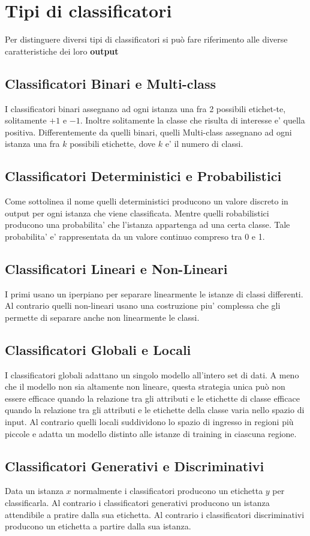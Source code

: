 \section{Tipi di classificatori}

  Per distinguere diversi tipi di classificatori si può fare riferimento alle diverse caratteristiche dei loro \textbf{output}

  \subsection*{Classificatori Binari e Multi-class}
    I classificatori binari assegnano ad ogni istanza una fra 2 possibili etichet-te, solitamente $+1$ e $-1$. Inoltre solitamente la classe che risulta di interesse e' quella positiva. Differentemente da quelli binari, quelli Multi-class assegnano ad ogni istanza una fra $k$ possibili etichette, dove $k$ e' il numero di classi.

  \subsection*{Classificatori Deterministici e Probabilistici}
    Come sottolinea il nome quelli deterministici producono un valore discreto in output per ogni istanza che viene classificata. Mentre quelli robabilistici producono una probabilita' che l'istanza appartenga ad una certa classe. Tale probabilita' e' rappresentata da un valore continuo compreso tra 0 e 1.

  \subsection*{Classificatori Lineari e Non-Lineari}
    I primi usano un iperpiano per separare linearmente le istanze di classi differenti. Al contrario quelli non-lineari usano una costruzione piu' complessa che gli permette di separare anche non linearmente le classi.

  \subsection*{Classificatori Globali e Locali}
    I classificatori globali adattano un singolo modello all'intero set di dati. A meno che il modello non sia altamente non lineare, questa strategia unica può non essere efficace quando la relazione tra gli attributi e le etichette di classe efficace quando la relazione tra gli attributi e le etichette della classe varia nello spazio di input. Al contrario quelli locali suddividono lo spazio di ingresso in regioni più piccole e adatta un modello distinto alle istanze di training in ciascuna regione.

  \subsection*{Classificatori Generativi e Discriminativi}
    Data un istanza $x$ normalmente i classificatori producono un etichetta $y$ per classificarla. Al contrario i classificatori generativi producono un istanza attendibile a pratire dalla sua etichetta. Al contrario i classificatori discriminativi producono un etichetta a partire dalla sua istanza.
